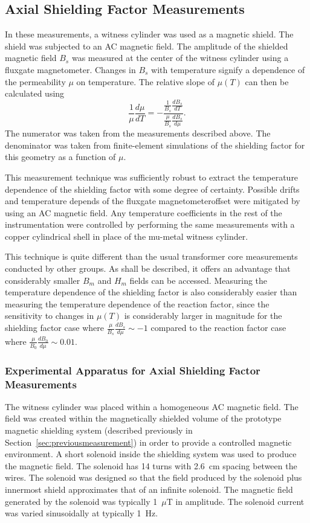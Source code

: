 
\subsection{Axial Shielding Factor Measurements\label{sec:axial}}


In these measurements, a witness cylinder was used as a magnetic
shield.  The shield was subjected to an AC magnetic field.  The
amplitude of the shielded magnetic field $B_s$ was measured at the
center of the witness cylinder using a fluxgate magnetometer.  Changes
in $B_s$ with temperature signify a dependence of the permeability
$\mu$ on temperature.  The relative slope of $\mu(T)$ can then be
calculated using
\begin{equation}
\frac{1}{\mu}\frac{d\mu}{dT}=-\frac{\frac{1}{B_s}\frac{dB_s}{dT}}{\frac{\mu}{B_s}\frac{dB_s}{d\mu}}.
\label{eqn:axial}
\end{equation}
The numerator was taken from the measurements described above. The
denominator was taken from finite-element simulations of the shielding
factor for this geometry as a function of $\mu$.

This measurement technique was sufficiently robust to extract the
temperature dependence of the shielding factor with some degree of
certainty.  Possible drifts and temperature depends of the fluxgate
magnetometeroffset were mitigated by using an AC magnetic field.  Any
temperature coefficients in the rest of the instrumentation were
controlled by performing the same measurements with a copper
cylindrical shell in place of the mu-metal witness cylinder.

This technique is quite different than the usual transformer core
measurements conducted by other groups.  As shall be described, it
offers an advantage that considerably smaller $B_m$ and $H_m$ fields
can be accessed.  Measuring the temperature dependence of the
shielding factor is also considerably easier than measuring the
temperature dependence of the reaction factor, since the sensitivity
to changes in $\mu(T)$ is considerably larger in magnitude for the
shielding factor case where $\frac{\mu}{B_s}\frac{dB_s}{d\mu}\sim -1$
compared to the reaction factor case where
$\frac{\mu}{B_0}\frac{dB_0}{d\mu}\sim 0.01$.


\subsubsection{Experimental Apparatus for Axial Shielding Factor Measurements}

The witness cylinder was placed within a homogeneous AC magnetic
field.  The field was created within the magnetically shielded volume
of the prototype magnetic shielding system (described previously in
Section~\ref{sec:previousmeasurement}) in order to provide a
controlled magnetic environment.  A short solenoid inside the
shielding system was used to produce the magnetic field.
The solenoid has 14 turns with 2.6~cm spacing between the wires.  The
solenoid was designed so that the field produced by the solenoid plus
innermost shield approximates that of an infinite solenoid.  The
magnetic field generated by the solenoid was typically 1~$\mu$T in
amplitude.  The solenoid current was varied sinusoidally at typically
1~Hz.

